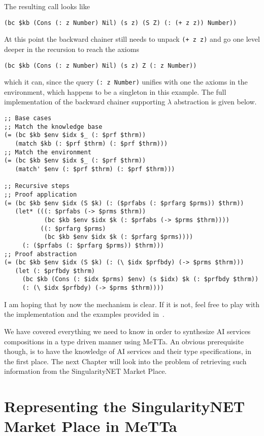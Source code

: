 \documentclass[]{report}
\begin{document}
The resulting call looks like
\begin{verbatim}
(bc $kb (Cons (: z Number) Nil) (s z) (S Z) (: (+ z z)) Number))
\end{verbatim}
At this point the backward chainer still needs to unpack
\texttt{(+ z z)} and go one level deeper in the
recursion to reach the axioms
\begin{verbatim}
(bc $kb (Cons (: z Number) Nil) (s z) Z (: z Number))
\end{verbatim}
which it can, since the query \texttt{(: z Number)}
unifies with one the axioms in the environment, which happens to be a
singleton in this example.  The full implementation of the backward
chainer supporting $\lambda$ abstraction is given below.
\begin{small}
\begin{verbatim}
;; Base cases
;; Match the knowledge base
(= (bc $kb $env $idx $_ (: $prf $thrm))
   (match $kb (: $prf $thrm) (: $prf $thrm)))
;; Match the environment
(= (bc $kb $env $idx $_ (: $prf $thrm))
   (match' $env (: $prf $thrm) (: $prf $thrm)))

;; Recursive steps
;; Proof application
(= (bc $kb $env $idx (S $k) (: ($prfabs (: $prfarg $prms)) $thrm))
   (let* (((: $prfabs (-> $prms $thrm))
           (bc $kb $env $idx $k (: $prfabs (-> $prms $thrm))))
          ((: $prfarg $prms)
           (bc $kb $env $idx $k (: $prfarg $prms))))
     (: ($prfabs (: $prfarg $prms)) $thrm)))
;; Proof abstraction
(= (bc $kb $env $idx (S $k) (: (\ $idx $prfbdy) (-> $prms $thrm)))
   (let (: $prfbdy $thrm)
     (bc $kb (Cons (: $idx $prms) $env) (s $idx) $k (: $prfbdy $thrm))
     (: (\ $idx $prfbdy) (-> $prms $thrm))))
\end{verbatim}
\end{small}
I am hoping that by now the mechanism is clear.  If it is not, feel
free to play with the implementation and the examples provided
in~\cite{TODO, TODO}.

We have covered everything we need to know in order to synthesize AI
services compositions in a type driven manner using MeTTa.  An obvious
prerequisite though, is to have the knowledge of AI services and their
type specifications, in the first place.  The next Chapter will look
into the problem of retrieving such information from the
SingularityNET Market Place.

\chapter{Representing the SingularityNET Market Place in  MeTTa}
\end{document}
